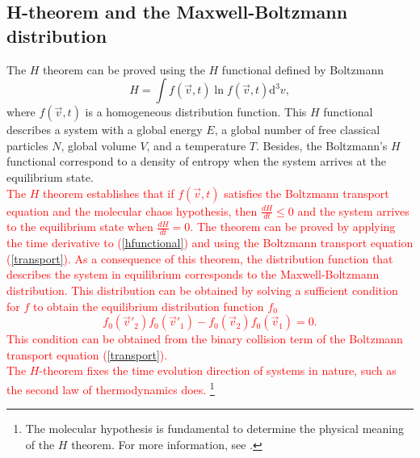 \documentclass{article}
\begin{document}
\subsection{H-theorem and the Maxwell-Boltzmann distribution}
The $H$ theorem can be proved using the $H$ functional defined by Boltzmann 
\begin{equation}
   H=\int f(\vec{v},t) \ln f(\vec{v},t) \mathrm{d}^{3}v,\label{hfunctional}
\end{equation} 
where $f(\vec{v},t)$ is a homogeneous distribution function. This $H$ functional describes a system with a global energy $E$, a global number of free
classical particles $N$, global volume $V$, and a temperature $T$. 
Besides, the Boltzmann's $H$ functional correspond to a density of entropy when the system arrives at the equilibrium state.\\
\textcolor{red}{The $H$ theorem establishes that if $f(\vec{v},t)$ satisfies the Boltzmann transport equation and the molecular chaos hypothesis, then $\frac{dH}{dt}\leq 0$ and the system arrives to the equilibrium state when $\frac{dH}{dt}=0$. The theorem can be proved by applying the time derivative to (\ref{hfunctional}) and using the Boltzmann transport equation (\ref{transport}). As a consequence of this theorem, the distribution function that describes the system in equilibrium corresponds to the Maxwell-Boltzmann distribution. This distribution can be obtained by solving a sufficient condition for $f$ to obtain the equilibrium distribution function $f_0$
\begin{equation}
    f_0(\vec{v}'_2)f_0(\vec{v}'_1)- f_0(\vec{v}_2)f_0(\vec{v}_1)=0.
\end{equation}
This condition can be obtained from the binary collision term of the Boltzmann transport equation (\ref{transport}).\\
The $H$-theorem fixes the time evolution direction of systems in nature, such as the second law of thermodynamics does. \footnote{The molecular hypothesis is fundamental to determine the physical meaning of the $H$ theorem. For more information, see \cite{huang}.}}
\end{document}
